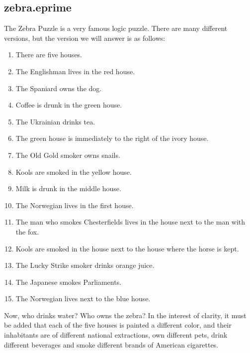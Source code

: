 \documentclass[oneside]{book}
\begin{document}
\subsection{zebra.eprime}\label{sect:zebra}
The Zebra Puzzle is a very famous logic puzzle. There are many different versions, but the version we will answer is as follows:
\begin{enumerate}
\item There are five houses.
\item The Englishman lives in the red house.
\item The Spaniard owns the dog.
\item Coffee is drunk in the green house.
\item The Ukrainian drinks tea.
\item The green house is immediately to the right of the ivory house.
\item The Old Gold smoker owns snails.
\item Kools are smoked in the yellow house.
\item Milk is drunk in the middle house.
\item The Norwegian lives in the first house.
\item The man who smokes Chesterfields lives in the house next to the man with the fox.
\item Kools are smoked in the house next to the house where the horse is kept.
\item The Lucky Strike smoker drinks orange juice.
\item The Japanese smokes Parliaments.
\item The Norwegian lives next to the blue house.
\end{enumerate}
Now, who drinks water? Who owns the zebra? In the interest of clarity, it must be added that each of the five houses is painted a different color, and their inhabitants are of different national extractions, own different pets, drink different beverages and smoke different brands of American cigarettes.
\end{document}
